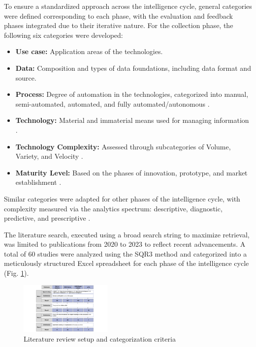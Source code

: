 \documentclass[10pt]{article}
\begin{document}
To ensure a standardized approach across the intelligence cycle, general categories were defined corresponding to each phase, with the evaluation and feedback phases integrated due to their iterative nature. For the collection phase, the following six categories were developed:
\begin{itemize}
    \item \textbf{Use case:} Application areas of the technologies.
    \item \textbf{Data:} Composition and types of data foundations, including data format and source.
    \item \textbf{Process:} Degree of automation in the technologies, categorized into manual, semi-automated, automated, and fully automated/autonomous \cite{Duncheon.2002, Billings.1997, Endsley.1999}.
    \item \textbf{Technology:} Material and immaterial means used for managing information \cite{Bleck.2004}.
    \item \textbf{Technology Complexity:} Assessed through subcategories of Volume, Variety, and Velocity \cite{OLeary.2012, Elgendy.2014, Russom.2011, Singh.2012}.
    \item \textbf{Maturity Level:} Based on the phases of innovation, prototype, and market establishment \cite{Stich.2022}.
\end{itemize}

Similar categories were adapted for other phases of the intelligence cycle, with complexity measured via the analytics spectrum: descriptive, diagnostic, predictive, and prescriptive \cite{Delen.2013}.

The literature search, executed using a broad search string to maximize retrieval, was limited to publications from 2020 to 2023 to reflect recent advancements. A total of 60 studies were analyzed using the SQR3 method \cite{Robinson.1970} and categorized into a meticulously structured Excel spreadsheet for each phase of the intelligence cycle (Fig. \ref{fig:LiteratureReview}).

\begin{figure}[t]
    \centering
    \includegraphics[width=0.4\textwidth]{PDF/images/crop_Kategorisierungskriterien und Literraturreviewaufbau}
    \caption{Literature review setup and categorization criteria}
    \label{fig:LiteratureReview}
\end{figure}
\end{document}
